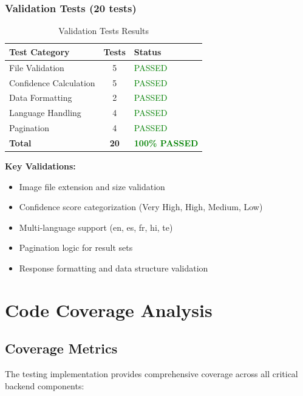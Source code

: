 \documentclass[12pt,a4paper]{article}
\begin{document}
\subsubsection{Validation Tests (20 tests)}

\begin{table}[H]
\centering
\begin{tabular}{|l|c|l|}
\hline
\textbf{Test Category} & \textbf{Tests} & \textbf{Status} \\
\hline
File Validation & 5 & \textcolor{green}{PASSED} \\
Confidence Calculation & 5 & \textcolor{green}{PASSED} \\
Data Formatting & 2 & \textcolor{green}{PASSED} \\
Language Handling & 4 & \textcolor{green}{PASSED} \\
Pagination & 4 & \textcolor{green}{PASSED} \\
\hline
\textbf{Total} & \textbf{20} & \textcolor{green}{\textbf{100\% PASSED}} \\
\hline
\end{tabular}
\caption{Validation Tests Results}
\end{table}

\textbf{Key Validations:}
\begin{itemize}
    \item Image file extension and size validation
    \item Confidence score categorization (Very High, High, Medium, Low)
    \item Multi-language support (en, es, fr, hi, te)
    \item Pagination logic for result sets
    \item Response formatting and data structure validation
\end{itemize}

\section{Code Coverage Analysis}

\subsection{Coverage Metrics}

The testing implementation provides comprehensive coverage across all critical backend components:
\end{document}
